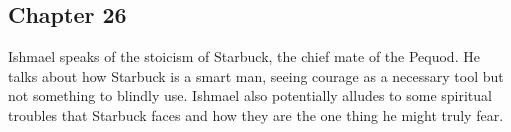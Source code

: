 \subsection{Chapter 26}

Ishmael speaks of the stoicism of Starbuck, the chief mate of the Pequod. He
talks about how Starbuck is a smart man, seeing courage as a necessary tool but
not something to blindly use. Ishmael also potentially alludes to some
spiritual troubles that Starbuck faces and how they are the one thing he might
truly fear.
